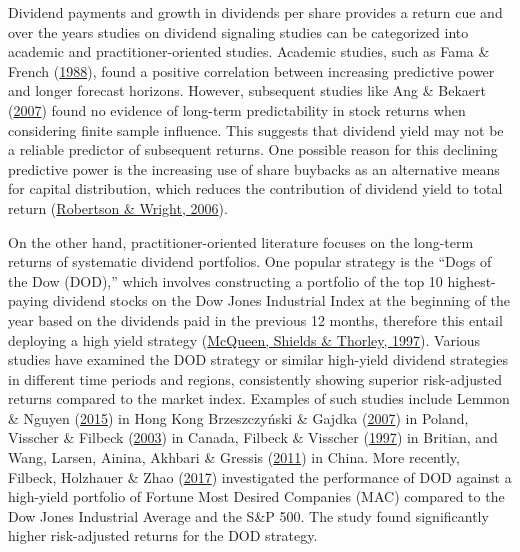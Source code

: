 \documentclass[11pt,preprint, authoryear]{elsarticle}
\numberwithin{equation}{section}
\numberwithin{figure}{section}
\numberwithin{table}{section}
\begin{document}
Dividend payments and growth in dividends per share provides a return
cue and over the years studies on dividend signaling studies can be
categorized into academic and practitioner-oriented studies. Academic
studies, such as Fama \& French
(\protect\hyperlink{ref-fama1988permanent}{1988}), found a positive
correlation between increasing predictive power and longer forecast
horizons. However, subsequent studies like Ang \& Bekaert
(\protect\hyperlink{ref-ang2007stock}{2007}) found no evidence of
long-term predictability in stock returns when considering finite sample
influence. This suggests that dividend yield may not be a reliable
predictor of subsequent returns. One possible reason for this declining
predictive power is the increasing use of share buybacks as an
alternative means for capital distribution, which reduces the
contribution of dividend yield to total return
(\protect\hyperlink{ref-robertson2006}{Robertson \& Wright, 2006}).

On the other hand, practitioner-oriented literature focuses on the
long-term returns of systematic dividend portfolios. One popular
strategy is the ``Dogs of the Dow (DOD),'' which involves constructing a
portfolio of the top 10 highest-paying dividend stocks on the Dow Jones
Industrial Index at the beginning of the year based on the dividends
paid in the previous 12 months, therefore this entail deploying a high
yield strategy (\protect\hyperlink{ref-mcqueen1997does}{McQueen, Shields
\& Thorley, 1997}). Various studies have examined the DOD strategy or
similar high-yield dividend strategies in different time periods and
regions, consistently showing superior risk-adjusted returns compared to
the market index. Examples of such studies include Lemmon \& Nguyen
(\protect\hyperlink{ref-lemmon2015dividend}{2015}) in Hong Kong
Brzeszczyński \& Gajdka
(\protect\hyperlink{ref-brzeszczynski2007dividend}{2007}) in Poland,
Visscher \& Filbeck (\protect\hyperlink{ref-visscher2003dividend}{2003})
in Canada, Filbeck \& Visscher
(\protect\hyperlink{ref-filbeck1997}{1997}) in Britian, and Wang,
Larsen, Ainina, Akhbari \& Gressis
(\protect\hyperlink{ref-wang2011dogs}{2011}) in China. More recently,
Filbeck, Holzhauer \& Zhao
(\protect\hyperlink{ref-filbeck2017dividend}{2017}) investigated the
performance of DOD against a high-yield portfolio of Fortune Most
Desired Companies (MAC) compared to the Dow Jones Industrial Average and
the S\&P 500. The study found significantly higher risk-adjusted returns
for the DOD strategy.

\newpage
\end{document}
